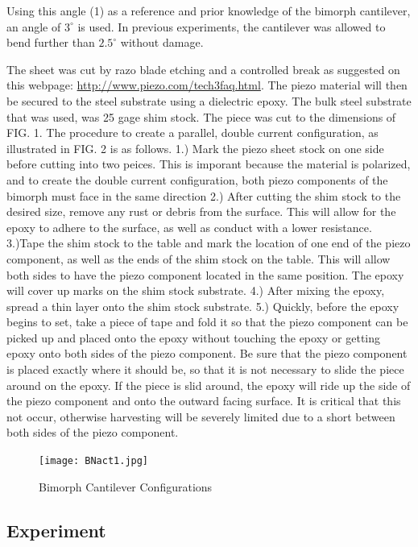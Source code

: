 \documentclass[aps,prl,twocolumn,groupedaddress]{revtex4}
\begin{document}
Using this angle (1) as a reference and prior knowledge of the bimorph cantilever, an angle of $3^\circ$ is used. In previous experiments, the cantilever was allowed to bend further than $2.5^\circ$ without damage. 

The sheet was cut by razo blade etching and a controlled break as suggested on this webpage: \url{http://www.piezo.com/tech3faq.html}. The piezo material will then be secured to the steel substrate using a dielectric epoxy. The bulk steel substrate that was used, was 25 gage shim stock. The piece was cut to the dimensions of FIG. 1. The procedure to create a parallel, double current configuration, as illustrated in FIG. 2 is as follows. 1.) Mark the piezo sheet stock on one side before cutting into two peices. This is imporant because the material is polarized, and to create the double current configuration, both piezo components of the bimorph must face in the same direction 2.) After cutting the shim stock to the desired size, remove any rust or debris from the surface. This will allow for the epoxy to adhere to the surface, as well as conduct with a lower resistance. 3.)Tape the shim stock to the table and mark the location of one end of the piezo component, as well as the ends of the shim stock on the table. This will allow both sides to have the piezo component located in the same position. The epoxy will cover up marks on the shim stock substrate. 4.) After mixing the epoxy, spread a thin layer onto the shim stock substrate. 5.) Quickly, before the epoxy begins to set, take a piece of tape and fold it so that the piezo component can be picked up and placed onto the epoxy without touching the epoxy or getting epoxy onto both sides of the piezo component. Be sure that the piezo component is placed exactly where it should be, so that it is not necessary to slide the piece around on the epoxy. If the piece is slid around, the epoxy will ride up the side of the piezo component and onto the outward facing surface. It is critical that this not occur, otherwise harvesting will be severely limited due to a short between both sides of the piezo component.

\begin{figure}[ht!]
  \centering
  \texttt{[image: BNact1.jpg]}
  \caption{Bimorph Cantilever Configurations}
\end{figure}

\subsection{Experiment}
  
\end{document}
